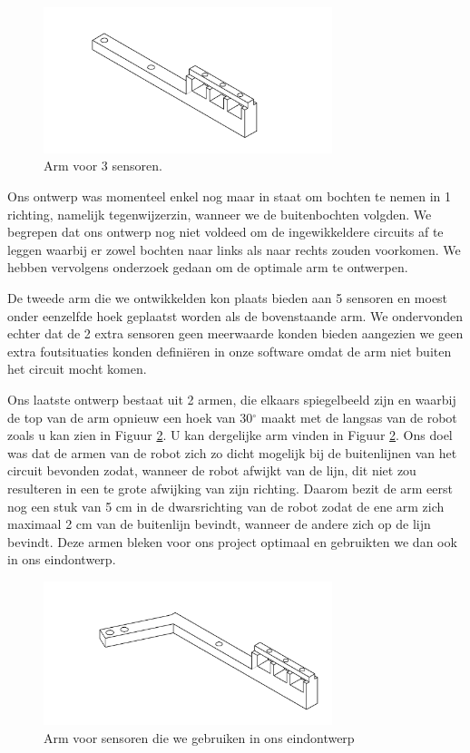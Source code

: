 \begin{figure}[H]
\centering
\includegraphics[width=0.75\textwidth]{3sensoren.png}
\caption{Arm voor 3 sensoren. \label{fig:3sensoren}}
\end{figure}


Ons ontwerp was momenteel enkel nog maar in staat om bochten te nemen in 1 richting, namelijk tegenwijzerzin, wanneer we de buitenbochten volgden. We begrepen dat ons ontwerp nog niet voldeed om de ingewikkeldere circuits af te leggen waarbij er zowel bochten naar links als naar rechts zouden voorkomen. We hebben vervolgens onderzoek gedaan om de optimale arm te ontwerpen.

De tweede arm die we ontwikkelden kon plaats bieden aan 5 sensoren en moest onder eenzelfde hoek geplaatst worden als de bovenstaande arm. We ondervonden echter dat de 2 extra sensoren geen meerwaarde konden bieden aangezien we geen extra foutsituaties konden defini\"eren in onze software omdat de arm niet buiten het circuit mocht komen. 

Ons laatste ontwerp bestaat uit 2 armen, die elkaars spiegelbeeld zijn en waarbij de top van de arm opnieuw een hoek van 30$^\circ$ maakt met de langsas van de robot zoals u kan zien in Figuur \ref{fig:schuinnaarvoor}. U kan dergelijke arm vinden in Figuur \ref{fig:schuinnaarvoor}. Ons doel was dat de armen van de robot zich zo dicht mogelijk bij de buitenlijnen van het circuit bevonden zodat, wanneer de robot afwijkt van de lijn, dit niet zou resulteren in een te grote afwijking van zijn richting. Daarom bezit de arm eerst nog een stuk van 5 cm in de dwarsrichting van de robot zodat de ene arm zich maximaal 2 cm van de buitenlijn bevindt, wanneer de andere zich op de lijn bevindt. Deze armen bleken voor ons project optimaal en gebruikten we dan ook in ons eindontwerp.

\begin{figure}[H]
\centering
\includegraphics[width=0.75\textwidth]{schuinnaarvoor.png}
\caption{Arm voor sensoren die we gebruiken in ons eindontwerp \label{fig:schuinnaarvoor}}
\end{figure}

